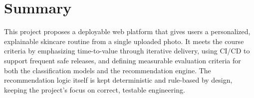 \documentclass[11pt,a4paper]{article}
\begin{document}
\section{Summary}
This project proposes a deployable web platform that
gives users a personalized, explainable skincare
routine from a single uploaded photo. It meets the
course criteria by emphasizing time-to-value through
iterative delivery, using CI/CD to support frequent
safe releases, and defining measurable evaluation
criteria for both the classification models and the
recommendation engine. The recommendation logic itself
is kept deterministic and rule-based by design, keeping
the project's focus on correct, testable engineering.
\end{document}
